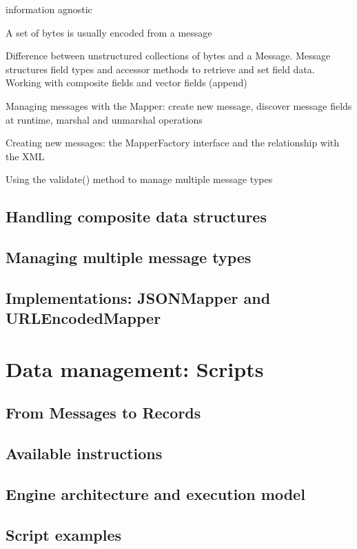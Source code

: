 information agnostic

A set of bytes is usually encoded from a message

Difference between unstructured collections of bytes and a Message.
Message structures field types and accessor methods to retrieve and set field
data. Working with composite fields and vector fields (append)

Managing messages with the Mapper: create new message, discover message
fields at runtime, marshal and unmarshal operations

Creating new messages: the MapperFactory interface and the relationship with
the XML

Using the validate() method to manage multiple message types



\subsection{Handling composite data structures}

\subsection{Managing multiple message types}

\subsection{Implementations: JSONMapper and URLEncodedMapper}


\section{Data management: Scripts}
\label{sec:components.script}

\subsection{From Messages to Records}

\subsection{Available instructions}

\subsection{Engine architecture and execution model}

\subsection{Script examples}



